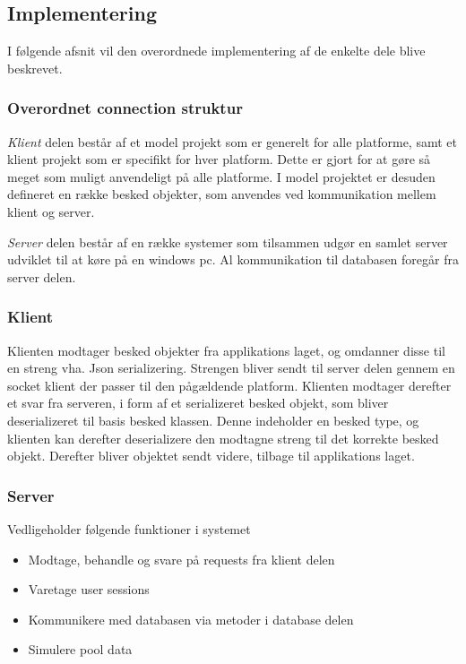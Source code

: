 \subsection{Implementering}
I følgende afsnit vil den overordnede implementering af de enkelte dele blive beskrevet.
\subsubsection{Overordnet connection struktur}
\textit{Klient} delen består af et model projekt som er generelt for alle platforme, samt et klient projekt som er specifikt for hver platform. Dette er gjort for at gøre så meget som muligt anvendeligt på alle platforme. I model projektet er desuden defineret en række besked objekter, som anvendes ved kommunikation mellem klient og server.

\textit{Server} delen består af en række systemer som tilsammen udgør en samlet server udviklet til at køre på en windows pc. Al kommunikation til databasen foregår fra server delen.

\subsubsection{Klient}
Klienten modtager besked objekter fra applikations laget, og omdanner disse til en streng vha. Json serializering. Strengen bliver sendt til server delen gennem en socket klient der passer til den pågældende platform.
Klienten modtager derefter et svar fra serveren, i form af et serializeret besked objekt, som bliver deserializeret til basis besked klassen. Denne indeholder en besked type, og klienten kan derefter deserializere den modtagne streng til det korrekte besked objekt. Derefter bliver objektet sendt videre, tilbage til applikations laget. 

\subsubsection{Server}
Vedligeholder følgende funktioner i systemet
\begin{itemize}
	\item Modtage, behandle og svare på requests fra klient delen
	\item Varetage user sessions
	\item Kommunikere med databasen via metoder i database delen
	\item Simulere pool data
\end{itemize}

